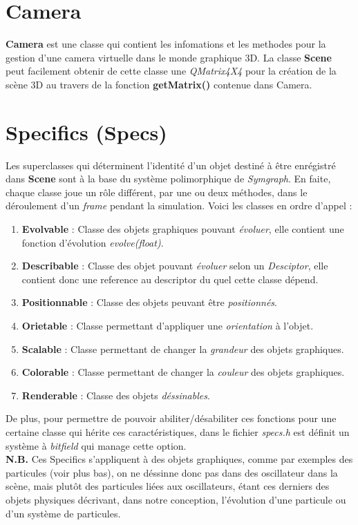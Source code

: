 \documentclass{report}
\begin{document}
\section {Camera}

\textbf{Camera} est une classe qui contient les infomations et les methodes pour la gestion d'une camera virtuelle dans le monde graphique 3D.
La classe \textbf{Scene} peut facilement obtenir de cette classe une \textit{QMatrix4X4} pour la création de la scène 3D au travers de la fonction \textbf{getMatrix()} contenue dans Camera.


\section {Specifics (Specs)}

Les superclasses qui déterminent l'identité d'un objet destiné à être enrégistré dans \textbf{Scene} sont à la base du système polimorphique de \textit{Symgraph}.
En faite, chaque classe joue un rôle différent, par une ou deux méthodes, dans le déroulement d'un \textit{frame} pendant la simulation.
Voici les classes en ordre d'appel :

\begin{enumerate}
\item \textbf{Evolvable} : Classe des objets graphiques pouvant \textit{évoluer}, elle contient une fonction d'évolution \textit{evolve(float)}.
\item \textbf{Describable} : Classe des objet pouvant \textit{évoluer} selon un \textit{Desciptor}, elle contient donc une reference au descriptor du quel cette classe dépend.
\item \textbf{Positionnable} : Classe des objets peuvant être \textit{positionnés}.
\item \textbf{Orietable} : Classe permettant d'appliquer une \textit{orientation} à l'objet.
\item \textbf{Scalable} : Classe permettant de changer la \textit{grandeur} des objets graphiques.
\item \textbf{Colorable} : Classe permettant de changer la \textit{couleur} des objets graphiques.
\item \textbf{Renderable} : Classe des objets \textit{déssinables}.
\end{enumerate}

De plus, pour permettre de pouvoir abiliter/désabiliter ces fonctions pour une certaine classe qui hérite ces caractéristiques, dans le fichier \textit{specs.h} est définit un
système à \textit{bitfield} qui manage cette option.
\\
 \textbf{N.B.}
 Ces Specifics s'appliquent à des objets graphiques, comme par exemples des particules (voir plus bas), on ne déssinne donc pas dans des oscillateur dans la scène,
 mais plutôt des particules liées aux oscillateurs, étant ces derniers des objets physiques décrivant, dans notre conception, l'évolution d'une particule ou d'un système de particules.
\end{document}
